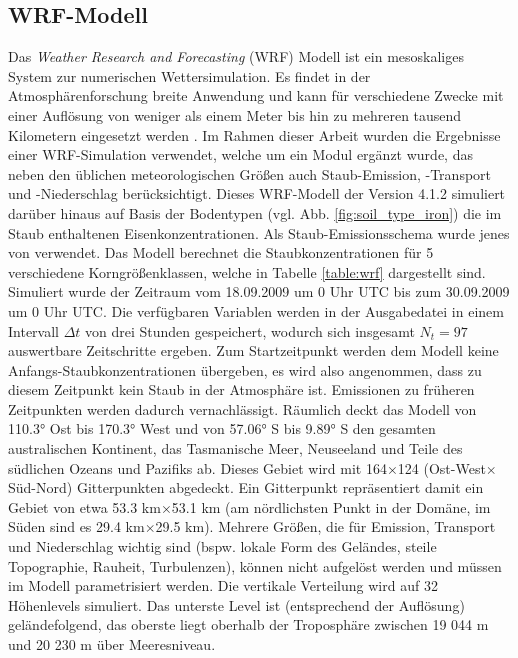 \documentclass[12pt,a4paper,onecolumn]{scrartcl}
\begin{document}
\subsection{WRF-Modell} \label{sec:wrf}
Das \textit{Weather Research and Forecasting} (WRF) Modell ist ein mesoskaliges System zur numerischen Wettersimulation. Es findet in der Atmosphärenforschung breite Anwendung und kann für verschiedene Zwecke mit einer Auflösung von weniger als einem Meter bis hin zu mehreren tausend Kilometern eingesetzt werden \citep{NCAR.2021}. Im Rahmen dieser Arbeit wurden die Ergebnisse einer WRF-Simulation verwendet, welche um ein Modul ergänzt wurde, das neben den üblichen meteorologischen Größen auch Staub-Emission, -Transport und -Niederschlag berücksichtigt. Dieses WRF-Modell der Version 4.1.2 simuliert darüber hinaus auf Basis der Bodentypen (vgl. Abb. \ref{fig:soil_type_iron}) die im Staub enthaltenen Eisenkonzentrationen. Als Staub-Emissionsschema wurde jenes von \citet{Shao.2004} verwendet. Das Modell berechnet die Staubkonzentrationen für 5 verschiedene Korngrößenklassen, welche in Tabelle \ref{table:wrf} dargestellt sind. Simuliert wurde der Zeitraum vom 18.09.2009 um 0 Uhr UTC bis zum 30.09.2009 um 0 Uhr UTC. Die verfügbaren Variablen werden in der Ausgabedatei in einem Intervall $\Delta t$ von drei Stunden gespeichert, wodurch sich insgesamt $N_t = 97$ auswertbare Zeitschritte ergeben. Zum Startzeitpunkt werden dem Modell keine Anfangs-Staubkonzentrationen übergeben, es wird also angenommen, dass zu diesem Zeitpunkt kein Staub in der Atmosphäre ist. Emissionen zu früheren Zeitpunkten werden dadurch vernachlässigt. Räumlich deckt das Modell von 110.3° Ost bis 170.3° West und von 57.06° S bis 9.89° S den gesamten australischen Kontinent, das Tasmanische Meer, Neuseeland und Teile des südlichen Ozeans und Pazifiks ab. Dieses Gebiet wird mit 164$\times$124 (Ost-West$\times$Süd-Nord) Gitterpunkten abgedeckt. Ein Gitterpunkt repräsentiert damit ein Gebiet von etwa 53.3 km$\times$53.1 km (am nördlichsten Punkt in der Domäne, im Süden sind es 29.4 km$\times$29.5 km). Mehrere Größen, die für Emission, Transport und Niederschlag wichtig sind (bspw. lokale Form des Geländes, steile Topographie, Rauheit, Turbulenzen), können nicht aufgelöst werden und müssen im Modell parametrisiert werden. Die vertikale Verteilung wird auf 32 Höhenlevels simuliert. Das unterste Level ist (entsprechend der Auflösung) geländefolgend, das oberste liegt oberhalb der Troposphäre zwischen 19 044 m und 20 230 m über Meeresniveau.
\end{document}
